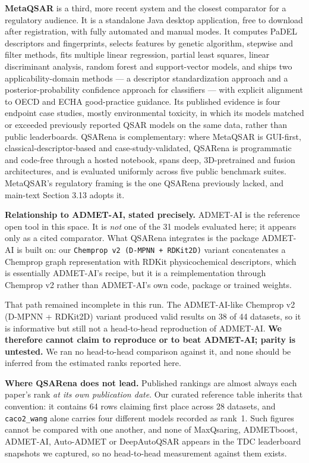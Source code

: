\documentclass[11pt,a4paper]{article}
\begin{document}
\textbf{MetaQSAR} \cite{ambure2026metaqsar} is a third, more recent system and the closest comparator for a regulatory audience. It is a standalone Java desktop application, free to download after registration, with fully automated and manual modes. It computes PaDEL descriptors and fingerprints, selects features by genetic algorithm, stepwise and filter methods, fits multiple linear regression, partial least squares, linear discriminant analysis, random forest and support-vector models, and ships two applicability-domain methods --- a descriptor standardization approach \cite{roy2015applicability} and a posterior-probability confidence approach for classifiers --- with explicit alignment to OECD and ECHA good-practice guidance. Its published evidence is four endpoint case studies, mostly environmental toxicity, in which its models matched or exceeded previously reported QSAR models on the same data, rather than public leaderboards. QSARena is complementary: where MetaQSAR is GUI-first, classical-descriptor-based and case-study-validated, QSARena is programmatic and code-free through a hosted notebook, spans deep, 3D-pretrained and fusion architectures, and is evaluated uniformly across five public benchmark suites. MetaQSAR's regulatory framing is the one QSARena previously lacked, and main-text Section 3.13 adopts it.

\textbf{Relationship to ADMET-AI, stated precisely.} ADMET-AI is the reference open tool in this space. It is \emph{not} one of the 31 models evaluated here; it appears only as a cited comparator. What QSARena integrates is the package ADMET-AI is built on: our \texttt{Chemprop v2 (D-MPNN + RDKit2D)} variant concatenates a Chemprop graph representation with RDKit physicochemical descriptors, which is essentially ADMET-AI's recipe, but it is a reimplementation through Chemprop v2 rather than ADMET-AI's own code, package or trained weights.

That path remained incomplete in this run. The ADMET-AI-like Chemprop v2 (D-MPNN + RDKit2D) variant produced valid results on 38 of 44 datasets, so it is informative but still not a head-to-head reproduction of ADMET-AI. \textbf{We therefore cannot claim to reproduce or to beat ADMET-AI; parity is untested.} We ran no head-to-head comparison against it, and none should be inferred from the estimated ranks reported here.

\textbf{Where QSARena does not lead.} Published rankings are almost always each paper's rank \emph{at its own publication date}. Our curated reference table inherits that convention: it contains 64 rows claiming first place across 28 datasets, and \texttt{caco2\_wang} alone carries four different models recorded as rank~1. Such figures cannot be compared with one another, and none of MaxQsaring, ADMETboost, ADMET-AI, Auto-ADMET or DeepAutoQSAR appears in the TDC leaderboard snapshots we captured, so no head-to-head measurement against them exists.
\end{document}
